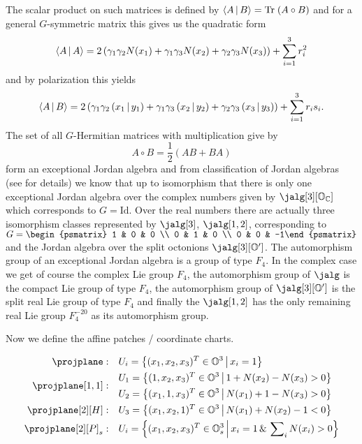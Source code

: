 The scalar product on such matrices is defined by $\langle A\,|\, B \rangle = \mathrm{Tr}\; (A \circ B)$ and for a general $G$-symmetric matrix this gives us the quadratic form
\[
	\langle A\,|\, A \rangle = 2\left( \gamma_1\gamma_2 N(x_1) + \gamma_1\gamma_3 N(x_2) + \gamma_2\gamma_3 N(x_3)\right) + \sum_{i=1}^{3} r_i^2
\]
and by polarization this yields
\begin{equation}\label{eq:jscal1}
\langle A\,|\, B \rangle = 2\left( \gamma_1\gamma_2 \left( x_1 \,|\, y_1 \right) + \gamma_1\gamma_3 \left( x_2 \,|\, y_2 \right) + \gamma_2\gamma_3\left( x_3 \,|\, y_3 \right) \right) + \sum_{i=1}^3 r_i s_i.
\end{equation}
The set of all $G$-Hermitian matrices with multiplication give by
\[
A \circ B = \frac{1}{2}(AB+BA)
\]
form an exceptional Jordan algebra and from classification of Jordan algebras (see \cite{springer_octonions_2000} for details) we know that up to isomorphism that there is only one exceptional Jordan algebra over the complex numbers given by $\jalg[3][\octo_\complex]$ which corresponds to $G=\mathrm{Id}$. Over the real numbers there are actually three isomorphism classes represented by $\jalg[3]$, $\jalg[1,2]$, corresponding to $G = \begin{psmatrix} 1 & 0 & 0 \\ 0 & 1 & 0 \\ 0 & 0 & -1\end{psmatrix}$ and the Jordan algebra over the split octonions $\jalg[3][\octo']$. The automorphism group of an exceptional Jordan algebra is a group of type $F_4$. In the complex case we get of course the complex Lie group $F_4$, the automorphism group of $\jalg$ is the compact Lie group of type $F_4$, the automorphism group of $\jalg[3][\octo']$ is the split real Lie group of type $F_4$ and finally the $\jalg[1,2]$ has the only remaining real Lie group $F_4^{-20}$ as its automorphism group. 

Now we define the affine patches / coordinate charts.

\begin{align}
\projplane: & \quad U_i = \set{(x_1, x_2, x_3)^T \in \octo^3 \,\middle|\, x_i = 1} \\
\projplane[1,1]:  & \quad 
	\begin{aligned}
			U_1 &= \set{(1, x_2, x_3)^T \in \octo^3 \,\middle|\, 1 + N(x_2) - N(x_3) > 0} \\
			U_2 &= \set{(x_1, 1, x_3)^T \in \octo^3 \,\middle|\, N(x_1) + 1  - N(x_3) > 0} \\
    \end{aligned} \\
\projplane[2][H]:  & \quad U_3 = \set{(x_1, x_2, 1)^T \in \octo^3 \,\middle|\, N(x_1) + N(x_2) - 1 < 0} \\
\projplane[2][P]_s: & \quad U_i = \set{(x_1, x_2, x_3)^T \in \octo_s^3 \,\middle|\, x_i = 1 \,\&\, \sum\nolimits_i N(x_i) > 0}
\end{align}

